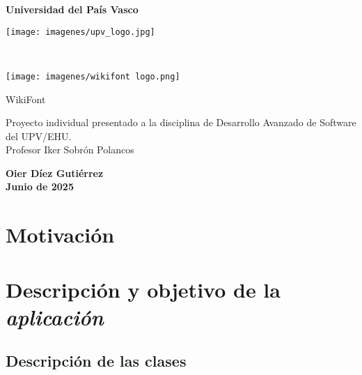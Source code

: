 \documentclass[11pt,a4paper]{article}
\begin{document}
\begin{titlepage}
 \vfill
  \begin{center}
   {\Huge\textbf{Universidad del País Vasco}} \\[1.5cm]
   
   \begin{minipage}[t]{0.5\textwidth}
   \centering
   \texttt{[image: imagenes/upv\_logo.jpg]}
   \end{minipage}
   \\ %
   \begin{minipage}[t]{0.5\textwidth}
   \centering
   \texttt{[image: imagenes/wikifont logo.png]}
   \end{minipage}
   
   \vfill

   {\huge WikiFont}\\[2.5cm]

   \hspace{.45\textwidth}
   \begin{minipage}{.5\textwidth}
   \large Proyecto individual presentado a la disciplina de Desarrollo Avanzado de Software del UPV/EHU.\\[1cm]

Profesor Iker Sobrón Polancos

  \end{minipage}
  \vfill

\vspace{2cm}

\large \textbf{Oier Díez Gutiérrez}\\

\large \textbf{Junio de 2025}
\end{center}
\end{titlepage}


\tableofcontents{}
\newpage

\section{Motivación}


\section{Descripción y objetivo de la \textit{aplicación}}

\subsection{Descripción de las clases}
\end{document}
